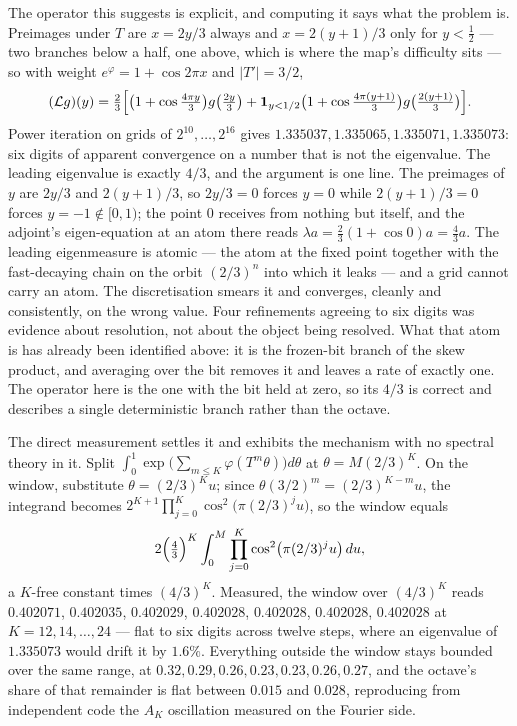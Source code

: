 \documentclass[11pt]{article}
\theoremstyle{remark}
\begin{document}
The operator this suggests is explicit, and computing it says what the problem is. Preimages under $T$
are $x=2y/3$ always and $x=2(y+1)/3$ only for $y<\tfrac12$ --- two branches below a half, one above,
which is where the map's difficulty sits --- so with weight $e^\varphi=1+\cos2\pi x$ and $|T'|=3/2$,
\[
  (\mathcal Lg)(y)=\tfrac23\Bigl[\bigl(1+\cos\tfrac{4\pi y}{3}\bigr)g\bigl(\tfrac{2y}3\bigr)
  +\mathbf 1_{y<1/2}\bigl(1+\cos\tfrac{4\pi(y+1)}{3}\bigr)g\bigl(\tfrac{2(y+1)}3\bigr)\Bigr].
\]
Power iteration on grids of $2^{10},\dots,2^{16}$ gives $1.335037,1.335065,1.335071,1.335073$: six digits
of apparent convergence on a number that is not the eigenvalue. The leading eigenvalue is exactly $4/3$,
and the argument is one line. The preimages of $y$ are $2y/3$ and $2(y+1)/3$, so $2y/3=0$ forces $y=0$
while $2(y+1)/3=0$ forces $y=-1\notin[0,1)$; the point $0$ receives from nothing but itself, and the
adjoint's eigen-equation at an atom there reads $\lambda a=\tfrac23(1+\cos0)a=\tfrac43a$. The leading
eigenmeasure is atomic --- the atom at the fixed point together with the fast-decaying chain on the orbit
$(2/3)^n$ into which it leaks --- and a grid cannot carry an atom. The discretisation smears it and
converges, cleanly and consistently, on the wrong value. Four refinements agreeing to six digits was
evidence about resolution, not about the object being resolved. What that atom is has already been
identified above: it is the frozen-bit branch of the skew product, and averaging over the bit removes it
and leaves a rate of exactly one. The operator here is the one with the bit held at zero, so its $4/3$
is correct and describes a single deterministic branch rather than the octave.

The direct measurement settles it and exhibits the mechanism with no spectral theory in it. Split
$\int_0^1\exp\bigl(\sum_{m\le K}\varphi(T^m\theta)\bigr)d\theta$ at $\theta=M(2/3)^K$. On the window,
substitute $\theta=(2/3)^Ku$; since $\theta(3/2)^m=(2/3)^{K-m}u$, the integrand becomes
$2^{K+1}\prod_{j=0}^{K}\cos^2\bigl(\pi(2/3)^ju\bigr)$, so the window equals
\begin{equation}\label{eq:window}
  2\Bigl(\tfrac43\Bigr)^{K}\int_0^M\prod_{j=0}^{K}\cos^2\bigl(\pi(2/3)^ju\bigr)\,du,
\end{equation}
a $K$-free constant times $(4/3)^K$. Measured, the window over $(4/3)^K$ reads $0.402071$, $0.402035$,
$0.402029$, $0.402028$, $0.402028$, $0.402028$, $0.402028$ at $K=12,14,\dots,24$ --- flat to six digits
across twelve steps, where an eigenvalue of $1.335073$ would drift it by $1.6\%$. Everything outside the
window stays bounded over the same range, at $0.32,0.29,0.26,0.23,0.23,0.26,0.27$, and the octave's share
of that remainder is flat between $0.015$ and $0.028$, reproducing from independent code the $A_K$
oscillation measured on the Fourier side.
\end{document}
